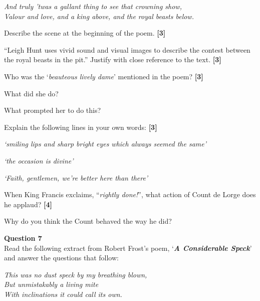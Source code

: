 \documentclass[12pt,a4paper]{article}
\newcommand{\qmarks}[1]{\hfill\textbf{[#1]}}
\begin{document}
\vspace{4pt}
\begin{center}
\textit{And truly 'twas a gallant thing to see that crowning show,}\\
\textit{Valour and love, and a king above, and the royal beasts below.}
\end{center}

\begin{romanenum}
    \item Describe the scene at the beginning of the poem. \qmarks{3}

    \item ``Leigh Hunt uses vivid sound and visual images to describe the contest between the royal beasts in the pit.'' Justify with close reference to the text. \qmarks{3}

    \item Who was the `\textit{beauteous lively dame}' mentioned in the poem? \qmarks{3}

    What did she do?

    What prompted her to do this?

    \item Explain the following lines in your own words: \qmarks{3}
    \begin{abcenum}
        \item \textit{`smiling lips and sharp bright eyes which always seemed the same'}
        \item \textit{`the occasion is divine'}
        \item \textit{`Faith, gentlemen, we're better here than there'}
    \end{abcenum}

    \item When King Francis exclaims, ``\textit{rightly done!}'', what action of Count de Lorge does he applaud? \qmarks{4}

    Why do you think the Count behaved the way he did?
\end{romanenum}

\vspace{10pt}

\textbf{Question 7}\\
Read the following extract from Robert Frost's poem, `\textbf{\textit{A Considerable Speck}}' and answer the questions that follow:

\vspace{4pt}
\begin{center}
\textit{This was no dust speck by my breathing blown,}\\
\textit{But unmistakably a living mite}\\
\textit{With inclinations it could call its own.}
\end{center}
\end{document}
